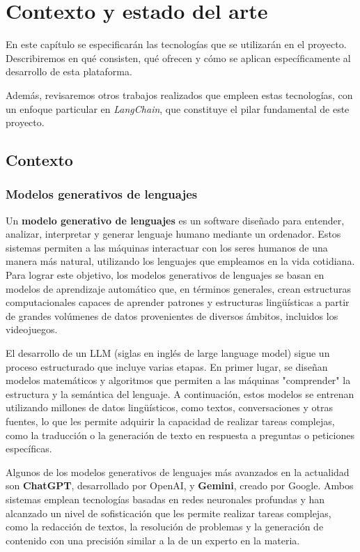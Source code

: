 
\chapter{Contexto y estado del arte }

En este capítulo se especificarán las tecnologías que se utilizarán en el proyecto. Describiremos en qué consisten, qué ofrecen y cómo se aplican específicamente al desarrollo de esta plataforma. 

Además, revisaremos otros trabajos realizados que empleen estas tecnologías, con un enfoque particular en \textit{LangChain}, que constituye el pilar fundamental de este proyecto.  

\newpage

\section{Contexto}

\subsection{Modelos generativos de lenguajes}

Un \textbf{modelo generativo de lenguajes} es un software diseñado para entender, analizar, interpretar y generar lenguaje humano mediante un ordenador. Estos sistemas permiten a las máquinas interactuar con los seres humanos de una manera más natural, utilizando los lenguajes que empleamos en la vida cotidiana. Para lograr este objetivo, los modelos generativos de lenguajes se basan en modelos de aprendizaje automático que, en términos generales, crean estructuras computacionales capaces de aprender patrones y estructuras lingüísticas a partir de grandes volúmenes de datos provenientes de diversos ámbitos, incluidos los videojuegos.

El desarrollo de un LLM (siglas en inglés de large language model) sigue un proceso estructurado que incluye varias etapas. En primer lugar, se diseñan modelos matemáticos y algoritmos que permiten a las máquinas "comprender" la estructura y la semántica del lenguaje. A continuación, estos modelos se entrenan utilizando millones de datos lingüísticos, como textos, conversaciones y otras fuentes, lo que les permite adquirir la capacidad de realizar tareas complejas, como la traducción o la generación de texto en respuesta a preguntas o peticiones específicas.

Algunos de los modelos generativos de lenguajes más avanzados en la actualidad son \textbf{ChatGPT}, desarrollado por OpenAI, y \textbf{Gemini}, creado por Google. Ambos sistemas emplean tecnologías basadas en redes neuronales profundas y han alcanzado un nivel de sofisticación que les permite realizar tareas complejas, como la redacción de textos, la resolución de problemas y la generación de contenido con una precisión similar a la de un experto en la materia.


